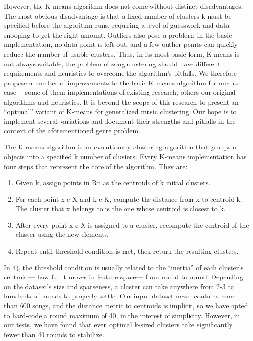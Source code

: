 \documentclass[10pt,twocolumn]{article}
\begin{document}
However, the K-means algorithm does not come without distinct disadvantages.  The most obvious disadvantage is that a fixed number of clusters k must be specified before the algorithm runs, requiring a level of guesswork and data snooping to get the right amount. Outliers also pose a problem; in the basic implementation, no data point is left out, and a few outlier points can quickly reduce the number of usable clusters. \cite{Sing} Thus, in its most basic form, K-means is not always suitable; the problem of song clustering should have different requirements and heuristics to overcome the algorithm’s pitfalls. We therefore propose a number of improvements to the basic K-means algorithm for our use case— some of them implementations of existing research, others our original algorithms and heuristics. It is beyond the scope of this research to present an “optimal” variant of K-means for generalized music clustering. Our hope is to implement several variations and document their strengths and pitfalls in the context of the aforementioned genre problem.

The K-means algorithm is an evolutionary clustering algorithm that groups n  objects into a specified k number of clusters. Every K-means implementation has four steps that represent the core of the algorithm. They are:

\begin{enumerate}
\item Given k, assign points in Rn as the centroids of k initial clusters.
\item For each point x e X and k e K, compute the distance from x to centroid k. The cluster that x belongs to is the one whose centroid is closest to k.
\item After every point x e X is assigned to a cluster, recompute the centroid of the cluster using the new elements.
\item Repeat until threshold condition is met, then return the resulting clusters. \cite{Sing}
\end{enumerate}

In 4), the threshold condition is usually related to the “inertia” of each cluster’s centroid— how far it moves in feature space— from round to round. Depending on the dataset’s size and sparseness, a cluster can take anywhere from 2-3 to hundreds of rounds to properly settle. Our input dataset never contains more than 600 songs, and the distance metric to centroids is implicit, so we have opted to hard-code a round maximum of 40, in the interest of simplicity. However, in our tests, we have found that even optimal k-sized clusters take significantly fewer than 40 rounds to stabilize. 
\end{document}
